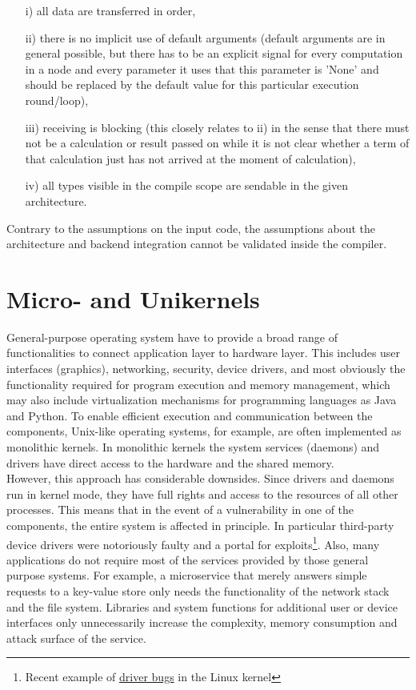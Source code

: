 \begin{itemize}
    \item[i)] all data are transferred in order,
    \item[ii)] there is no implicit use of default arguments (default arguments are in general possible, but there has to be an explicit signal for every computation in a node and every parameter it uses that this parameter is 'None' and should be replaced by the default value for this particular execution round/loop),
    \item[iii)] receiving is blocking (this closely relates to ii) in the sense that there must not be a calculation or result passed on while it is not clear whether a term of that calculation just has not arrived at the moment of calculation),
    \item[iv)] all types visible in the compile scope are sendable in the given architecture.
\end{itemize}

Contrary to the assumptions on the input code, the assumptions about the architecture and backend integration cannot be validated inside the compiler. 
    
\section{Micro- and Unikernels}

General-purpose operating system have to provide a broad range of functionalities to connect application layer to hardware layer. This includes user interfaces (graphics), networking, security, device drivers, and most obviously the functionality required for program execution and memory management, which may also include virtualization mechanisms for programming languages as Java and Python. To enable efficient execution and communication between the components, Unix-like operating systems, for example, are often implemented as monolithic kernels. In monolithic kernels the system services (daemons) and drivers have direct access to the hardware and the shared memory. \\

However, this approach has considerable downsides. Since drivers and daemons run in kernel mode, they have full rights and access to the resources of all other processes. This means that in the event of a vulnerability in one of the components, the entire system is affected in principle. In particular third-party device drivers were notoriously faulty and a portal for exploits\footnote{Recent example of \href{https://nakedsecurity.sophos.com/2021/03/17/serious-security-the-linux-kernel-bugs-that-surfaced-after-15-years/}{driver bugs} in the Linux kernel }. Also, many applications do not require most of the services provided by those general purpose systems. For example, a microservice that merely answers simple requests to a key-value store only needs the functionality of the network stack and the file system. Libraries and system functions for additional user or device interfaces only unnecessarily increase the complexity, memory consumption and attack surface of the service. \\

